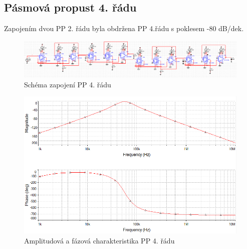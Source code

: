 \subsection{Pásmová propust 4. řádu}\label{s:PP4}
\noindent Zapojením dvou PP 2. řádu byla obdržena PP 4.řádu s poklesem -80 dB/dek. 
\begin{figure}[H]
\centering
\includegraphics[scale=0.5]{PP4O.png}
\caption{Schéma zapojení PP 4. řádu}
\end{figure}
\begin{figure}[H]
\centering
\includegraphics[scale=0.6]{PP4O2.png}
\caption{Amplitudová a fázová charakteristika PP 4. řádu}
\end{figure}